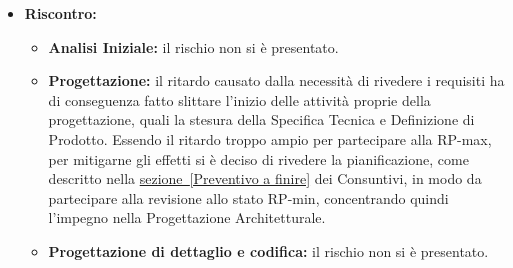 \documentclass[a4paper,11pt]{article}
\begin{document}
\begin{itemize}
		\item \textbf{Riscontro:}
			\begin{itemize}
				\item\textbf{Analisi Iniziale:} il rischio non si è presentato.
				\item\textbf{Progettazione:} il ritardo causato dalla necessità di rivedere i requisiti ha di conseguenza fatto slittare l'inizio delle attività proprie della progettazione, quali la stesura della Specifica Tecnica e Definizione di Prodotto. Essendo il ritardo troppo ampio per partecipare alla RP-max, per mitigarne gli effetti si è deciso di rivedere la pianificazione, come descritto nella \underline{sezione~\ref{Preventivo a finire}} dei Consuntivi, in modo da partecipare alla revisione allo stato RP-min, concentrando quindi l'impegno nella Progettazione Architetturale.
				\item\textbf{Progettazione di dettaglio e codifica:} il rischio non si è presentato.
			\end{itemize}
		\end{itemize}
\end{document}
